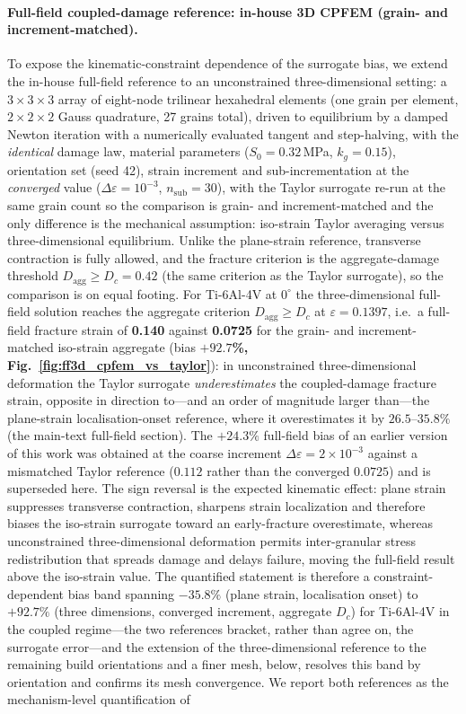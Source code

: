 \documentclass[11pt,a4paper,twocolumn]{article}
\providecommand{\ang}[1]{\ensuremath{#1^{\circ}}}
\begin{document}
\paragraph{Full-field coupled-damage reference: in-house 3D CPFEM (grain- and increment-matched).}
To expose the kinematic-constraint dependence of the surrogate bias, we extend the in-house full-field reference to an unconstrained three-dimensional setting: a $3\times3\times3$ array of eight-node trilinear hexahedral elements (one grain per element, $2\times2\times2$ Gauss quadrature, 27 grains total), driven to equilibrium by a damped Newton iteration with a numerically evaluated tangent and step-halving, with the \emph{identical} damage law, material parameters ($S_0 = 0.32$\,MPa, $k_g = 0.15$), orientation set (seed 42), strain increment and sub-incrementation at the \emph{converged} value ($\Delta\varepsilon = 10^{-3}$, $n_{\mathrm{sub}} = 30$), with the Taylor surrogate re-run at the same grain count so the comparison is grain- and increment-matched and the only difference is the mechanical assumption: iso-strain Taylor averaging versus three-dimensional equilibrium. Unlike the plane-strain reference, transverse contraction is fully allowed, and the fracture criterion is the aggregate-damage threshold $D_{\mathrm{agg}} \ge D_c = 0.42$ (the same criterion as the Taylor surrogate), so the comparison is on equal footing. For Ti-6Al-4V at $\ang{0}$ the three-dimensional full-field solution reaches the aggregate criterion $D_{\mathrm{agg}} \ge D_c$ at $\varepsilon = 0.1397$, i.e.\ a full-field fracture strain of \textbf{0.140} against \textbf{0.0725} for the grain- and increment-matched iso-strain aggregate (bias \textbf{$+92.7$\%, Fig.~\ref{fig:ff3d_cpfem_vs_taylor}}): in unconstrained three-dimensional deformation the Taylor surrogate \emph{underestimates} the coupled-damage fracture strain, opposite in direction to---and an order of magnitude larger than---the plane-strain localisation-onset reference, where it overestimates it by $26.5$--$35.8\%$ (the main-text full-field section). The $+24.3\%$ full-field bias of an earlier version of this work was obtained at the coarse increment $\Delta\varepsilon=2\times10^{-3}$ against a mismatched Taylor reference ($0.112$ rather than the converged $0.0725$) and is superseded here. The sign reversal is the expected kinematic effect: plane strain suppresses transverse contraction, sharpens strain localization and therefore biases the iso-strain surrogate toward an early-fracture overestimate, whereas unconstrained three-dimensional deformation permits inter-granular stress redistribution that spreads damage and delays failure, moving the full-field result above the iso-strain value. The quantified statement is therefore a constraint-dependent bias band spanning $-35.8\%$ (plane strain, localisation onset) to $+92.7\%$ (three dimensions, converged increment, aggregate $D_c$) for Ti-6Al-4V in the coupled regime---the two references bracket, rather than agree on, the surrogate error---and the extension of the three-dimensional reference to the remaining build orientations and a finer mesh, below, resolves this band by orientation and confirms its mesh convergence. We report both references as the mechanism-level quantification of 
\end{document}
